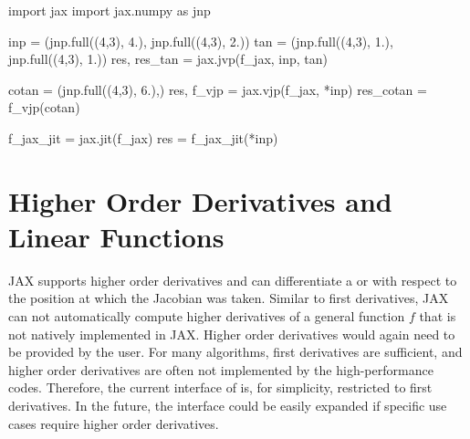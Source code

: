 \documentclass[10pt,a4paper,onecolumn]{article}
\let\textttOrig=\texttt
\def\texttt#1{\expandafter\textttOrig{\seqsplit{#1}}}
\newenvironment{Shaded}{}{}
\newcommand{\DecValTok}[1]{\textcolor[rgb]{0.25,0.63,0.44}{#1}}
\newcommand{\FloatTok}[1]{\textcolor[rgb]{0.25,0.63,0.44}{#1}}
\newcommand{\ImportTok}[1]{#1}
\newcommand{\NormalTok}[1]{#1}
\newcommand{\OperatorTok}[1]{\textcolor[rgb]{0.40,0.40,0.40}{#1}}
\begin{document}
\begin{Shaded}
\begin{Highlighting}[]
\ImportTok{import}\NormalTok{ jax}
\ImportTok{import}\NormalTok{ jax.numpy }\ImportTok{as}\NormalTok{ jnp}

\NormalTok{inp }\OperatorTok{=}\NormalTok{ (jnp.full((}\DecValTok{4}\NormalTok{,}\DecValTok{3}\NormalTok{), }\FloatTok{4.}\NormalTok{), jnp.full((}\DecValTok{4}\NormalTok{,}\DecValTok{3}\NormalTok{), }\FloatTok{2.}\NormalTok{))}
\NormalTok{tan }\OperatorTok{=}\NormalTok{ (jnp.full((}\DecValTok{4}\NormalTok{,}\DecValTok{3}\NormalTok{), }\FloatTok{1.}\NormalTok{), jnp.full((}\DecValTok{4}\NormalTok{,}\DecValTok{3}\NormalTok{), }\FloatTok{1.}\NormalTok{))}
\NormalTok{res, res\_tan }\OperatorTok{=}\NormalTok{ jax.jvp(f\_jax, inp, tan)}

\NormalTok{cotan }\OperatorTok{=}\NormalTok{ (jnp.full((}\DecValTok{4}\NormalTok{,}\DecValTok{3}\NormalTok{), }\FloatTok{6.}\NormalTok{),)}
\NormalTok{res, f\_vjp }\OperatorTok{=}\NormalTok{ jax.vjp(f\_jax, }\OperatorTok{*}\NormalTok{inp)}
\NormalTok{res\_cotan }\OperatorTok{=}\NormalTok{ f\_vjp(cotan)}

\NormalTok{f\_jax\_jit }\OperatorTok{=}\NormalTok{ jax.jit(f\_jax)}
\NormalTok{res }\OperatorTok{=}\NormalTok{ f\_jax\_jit(}\OperatorTok{*}\NormalTok{inp)}
\end{Highlighting}
\end{Shaded}

\hypertarget{higher-order-derivatives-and-linear-functions}{%
\section{Higher Order Derivatives and Linear
Functions}\label{higher-order-derivatives-and-linear-functions}}

JAX supports higher order derivatives and can differentiate a
\texttt{jvp} or \texttt{vjp} with respect to the position at which the
Jacobian was taken. Similar to first derivatives, JAX can not
automatically compute higher derivatives of a general function \(f\)
that is not natively implemented in JAX. Higher order derivatives would
again need to be provided by the user. For many algorithms, first
derivatives are sufficient, and higher order derivatives are often not
implemented by the high-performance codes. Therefore, the current
interface of \texttt{JAXbind} is, for simplicity, restricted to first
derivatives. In the future, the interface could be easily expanded if
specific use cases require higher order derivatives.
\end{document}
